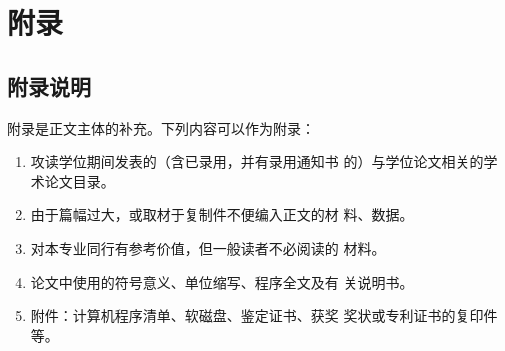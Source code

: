 \appendix
\chapter{附录}
\section*{附录说明}
附录是正文主体的补充。下列内容可以作为附录：
\begin{enumerate}
    \item 攻读学位期间发表的（含已录用，并有录用通知书
    的）与学位论文相关的学术论文目录。
    \item 由于篇幅过大，或取材于复制件不便编入正文的材
    料、数据。
    \item 对本专业同行有参考价值，但一般读者不必阅读的
    材料。
    \item 论文中使用的符号意义、单位缩写、程序全文及有
    关说明书。
    \item 附件：计算机程序清单、软磁盘、鉴定证书、获奖
    奖状或专利证书的复印件等。
\end{enumerate}
